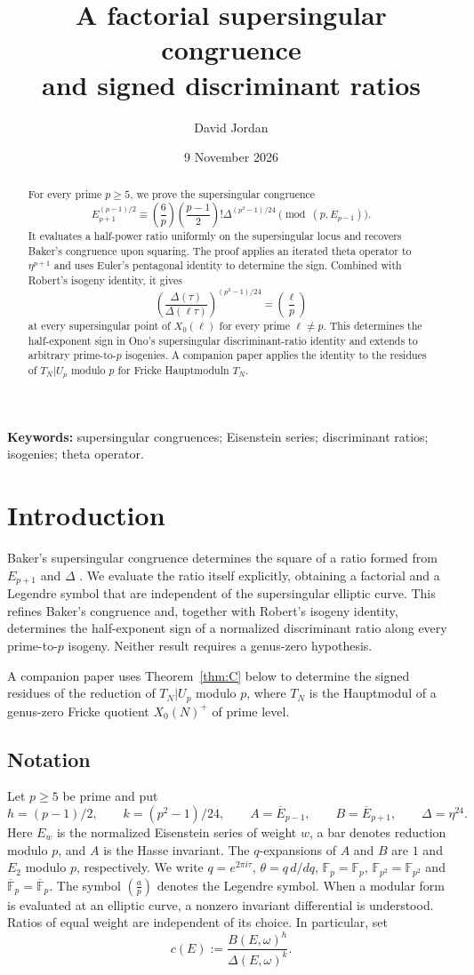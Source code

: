 \documentclass[11pt,a4paper]{article}
\title{A factorial supersingular congruence\\and signed discriminant ratios}
\author{David Jordan}
\date{9 November 2026}
\numberwithin{equation}{section}
\theoremstyle{definition}
\theoremstyle{remark}
\newcommand{\Fp}{\mathbb F_p}
\newcommand{\Fq}{\mathbb F_{p^2}}
\newcommand{\Fb}{\overline{\mathbb F}_p}
\begin{document}
\maketitle
\begin{abstract}
For every prime $p\ge5$, we prove the supersingular congruence
\[
E_{p+1}^{(p-1)/2}\equiv
\left(\frac6p\right)\left(\frac{p-1}{2}\right)!
\Delta^{(p^2-1)/24}\pmod{(p,E_{p-1})}.
\]
It evaluates a half-power ratio uniformly on the supersingular locus
and recovers Baker's congruence upon squaring. The proof applies an
iterated theta operator to $\eta^{p+1}$ and uses Euler's pentagonal
identity to determine the sign. Combined with Robert's isogeny identity,
it gives
\[
\left(\frac{\Delta(\tau)}{\Delta(\ell\tau)}\right)^{(p^2-1)/24}
=\left(\frac{\ell}{p}\right)
\]
at every supersingular point of $X_0(\ell)$ for every prime $\ell\ne p$.
This determines the half-exponent sign in Ono's supersingular
discriminant-ratio identity and extends to arbitrary prime-to-$p$
isogenies. A companion paper applies the identity to the residues of
$T_N|U_p$ modulo $p$ for Fricke Hauptmoduln $T_N$.
\end{abstract}
\noindent\textbf{Keywords:} supersingular congruences; Eisenstein series; discriminant ratios; isogenies; theta operator.

\section{Introduction}\label{sec:intro}
Baker's supersingular congruence determines the square of a ratio
formed from $E_{p+1}$ and $\Delta$ \citep{Baker98}. We evaluate the
ratio itself explicitly, obtaining a factorial and a Legendre symbol
that are independent of the supersingular elliptic curve. This refines
Baker's congruence and, together with Robert's isogeny identity,
determines the half-exponent sign of a normalized discriminant ratio
along every prime-to-$p$ isogeny. Neither result requires a genus-zero
hypothesis.

A companion paper \citep{JordanFricke} uses Theorem~\ref{thm:C} below to
determine the signed residues of the reduction of $T_N|U_p$ modulo $p$,
where $T_N$ is the Hauptmodul of a genus-zero Fricke quotient
$X_0(N)^+$ of prime level.

\subsection{Notation}
Let $p\ge5$ be prime and put
\[
h=(p-1)/2,\qquad k=(p^2-1)/24,\qquad
A=\overline E_{p-1},\qquad B=\overline E_{p+1},\qquad
\Delta=\eta^{24}.
\]
Here $E_w$ is the normalized Eisenstein series of weight $w$, a bar
denotes reduction modulo $p$, and $A$ is the Hasse invariant. The
$q$-expansions of $A$ and $B$ are $1$ and $E_2$ modulo $p$,
respectively. We write $q=e^{2\pi i\tau}$, $\theta=q\,d/dq$,
$\Fp=\mathbb F_p$, $\Fq=\mathbb F_{p^2}$ and
$\Fb=\overline{\mathbb F}_p$.
The symbol $\left(\frac{a}{p}\right)$ denotes the Legendre symbol.
When a modular form is evaluated at an elliptic curve, a nonzero
invariant differential is understood. Ratios of equal weight are
independent of its choice. In particular, set
\[
c(E):=\frac{B(E,\omega)^h}{\Delta(E,\omega)^k}.
\]
\end{document}
